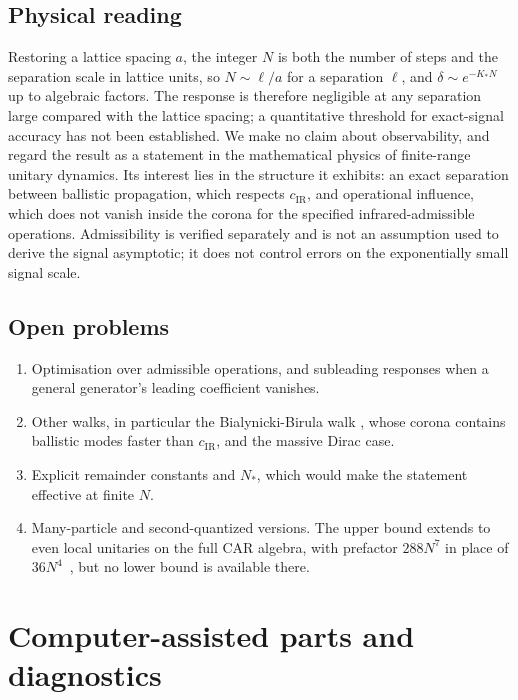 \documentclass[11pt]{amsart}
\theoremstyle{definition}
\theoremstyle{remark}
\newcommand{\cIR}{c_{\mathrm{IR}}}
\begin{document}
\subsection{Physical reading}
Restoring a lattice spacing $a$, the integer $N$ is both the number of
steps and the separation scale in lattice units, so $N\sim\ell/a$ for a
separation $\ell$, and $\delta\sim e^{-K_*N}$ up to algebraic factors.  The
response is therefore negligible at any separation large compared with the
lattice spacing; a quantitative threshold for exact-signal accuracy has not been established.  We make no claim about observability, and
regard the result as a statement in the mathematical physics of finite-range
unitary dynamics.
Its interest lies in the structure it exhibits: an exact separation between
ballistic propagation, which respects $\cIR$, and operational influence,
which does not vanish inside the corona for the specified
infrared-admissible operations. Admissibility is verified separately and
is not an assumption used to derive the signal asymptotic; it does not
control errors on the exponentially small signal scale.

\subsection{Open problems}
\begin{enumerate}[label=(\arabic*)]
\item Optimisation over admissible operations, and subleading responses
  when a general generator's leading coefficient vanishes.
\item Other walks, in particular the Bialynicki-Birula walk
  \cite[Eq.~(5.12)]{CJWW}, whose corona contains ballistic modes faster than
  $\cIR$, and the massive Dirac case.
\item Explicit remainder constants and $N_*$, which would make the
  statement effective at finite $N$.
\item Many-particle and second-quantized versions.  The upper bound
  extends to even local unitaries on the full CAR algebra, with prefactor
  $288N^7$ in place of $36N^4$~\cite{Repo}, but no lower bound is available
  there.
\end{enumerate}

\appendix

\section{Computer-assisted parts and diagnostics}\label{app:numerics}
\end{document}

